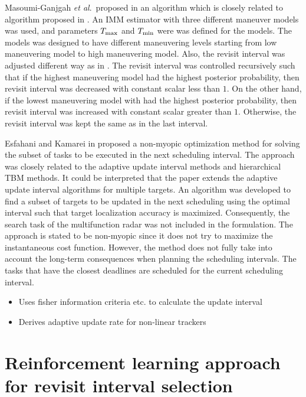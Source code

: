 \documentclass[11pt,a4paper]{article}
\newcommand{\etal}{\textit{et al}.~}
\begin{document}
Masoumi-Ganjgah \etal proposed in \cite{Masoumi-Ganjgah2017} an algorithm which is closely related to algorithm proposed in \cite{Benoudnine2006}.
An IMM estimator with three different maneuver models was used, and parameters $T_\text{max}$ and $T_\text{min}$ were was defined for the models.
The models was designed to have different maneuvering levels starting from low maneuvering model to high maneuvering model.
Also, the revisit interval was adjusted different way as in \cite{Benoudnine2006}.
The revisit interval was controlled recursively such that if the highest maneuvering model had the highest posterior probability, then 
revisit interval was decreased with constant scalar less than $1$.
On the other hand, if the lowest maneuvering model with had the highest posterior probability, then
revisit interval was increased with constant scalar greater than $1$.
Otherwise, the revisit interval was kept the same as in the last interval.

Esfahani and Kamarei in \cite{Esfahani2012} proposed a non-myopic optimization method for solving the subset of tasks to be executed in the next scheduling interval.
The approach was closely related to the adaptive update interval methods and hierarchical TBM methods.
It could be interpreted that the paper extends the adaptive update interval algorithms for multiple targets.
An algorithm was developed to find a subset of targets to be updated in the next scheduling using the optimal interval such that target localization accuracy is maximized.
Consequently, the search task of the multifunction radar was not included in the formulation.
The approach is stated to be non-myopic since it does not try to maximize the instantaneous cost function.
However, the method does not fully take into account the long-term consequences when planning the scheduling intervals.
The tasks that have the closest deadlines are scheduled for the current scheduling interval.

\begin{itemize}
    \item \cite{Christiansen2018} Uses fisher information criteria etc. to calculate the update interval
    \item \cite{Pilte2018} Derives adaptive update rate for non-linear trackers
\end{itemize}

\newpage
\section{Reinforcement learning approach for revisit interval selection}
\end{document}
